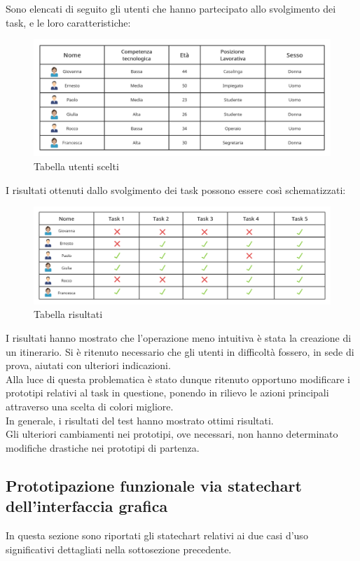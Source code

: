 \documentclass{natourDoc}
\begin{document}
Sono elencati di seguito gli utenti che hanno partecipato allo svolgimento dei task, e le loro caratteristiche:
\begin{figure}[!htbp]
	\centering
	\includegraphics[width=\textwidth]{./usability/task_users.png}
	\caption{Tabella utenti scelti}
\end{figure}
\FloatBarrier

I risultati ottenuti dallo svolgimento dei task possono essere così schematizzati:
\begin{figure}[!htbp]
	\centering
	\includegraphics[width=\textwidth]{./usability/task_table.png}
	\caption{Tabella risultati}
\end{figure}
\FloatBarrier

I risultati hanno mostrato che l'operazione meno intuitiva è stata 
la creazione di un itinerario. Si è ritenuto necessario che gli utenti in difficoltà fossero, 
in sede di prova, aiutati con ulteriori indicazioni. \\
Alla luce di questa problematica è stato dunque ritenuto opportuno modificare i prototipi relativi al 
task in questione, ponendo in rilievo le azioni principali attraverso una scelta di colori migliore.\\

In generale, i risultati del test hanno mostrato ottimi risultati.  \\ 
Gli ulteriori cambiamenti nei prototipi, ove necessari, non hanno determinato modifiche drastiche nei 
prototipi di partenza.


\newpage
\subsection{Prototipazione funzionale via statechart dell'interfaccia grafica}
In questa sezione sono riportati gli statechart relativi ai due
casi d'uso significativi dettagliati nella sottosezione precedente.
\end{document}
